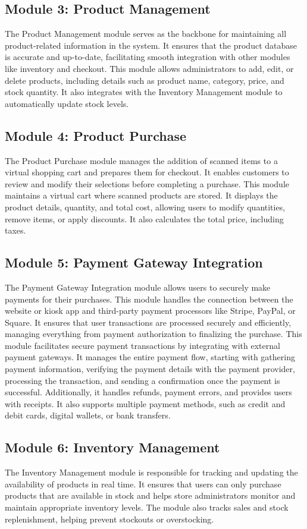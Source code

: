 \documentclass[conference]{IEEEtran}
\begin{document}
\subsection{Module 3: Product Management} 
The Product Management module serves as the backbone for maintaining all product-related information in the system. It ensures that the product database is accurate and up-to-date, facilitating smooth integration with other modules like inventory and checkout.
This module allows administrators to add, edit, or delete products, including details such as product name, category, price, and stock quantity. It also integrates with the Inventory Management module to automatically update stock levels.

\subsection{Module 4: Product Purchase} 
The Product Purchase module manages the addition of scanned items to a virtual shopping cart and prepares them for checkout. It enables customers to review and modify their selections before completing a purchase.
This module maintains a virtual cart where scanned products are stored. It displays the product details, quantity, and total cost, allowing users to modify quantities, remove items, or apply discounts. It also calculates the total price, including taxes.
\subsection{Module 5: Payment Gateway Integration} 
The Payment Gateway Integration module allows users to securely make payments for their purchases. This module handles the connection between the website or kiosk app and third-party payment processors like Stripe, PayPal, or Square. It ensures that user transactions are processed securely and efficiently, managing everything from payment authorization to finalizing the purchase.
This module facilitates secure payment transactions by integrating with external payment gateways. It manages the entire payment flow, starting with gathering payment information, verifying the payment details with the payment provider, processing the transaction, and sending a confirmation once the payment is successful. Additionally, it handles refunds, payment errors, and provides users with receipts. It also supports multiple payment methods, such as credit and debit cards, digital wallets, or bank transfers.

\subsection{Module 6: Inventory Management}
The Inventory Management module is responsible for tracking and updating the availability of products in real time. It ensures that users can only purchase products that are available in stock and helps store administrators monitor and maintain appropriate inventory levels. The module also tracks sales and stock replenishment, helping prevent stockouts or overstocking.
\end{document}
